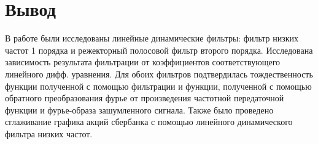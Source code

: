 \documentclass[a4paper, 12pt]{article}
\begin{document}
\section{Вывод}
В работе были исследованы линейные динамические фильтры: фильтр низких частот 1 порядка и режекторный полосовой фильтр второго порядка. Исследована зависимость результата фильтрации от коэффициентов соответствующего линейного дифф. уравнения. 
\newline
Для обоих фильтров подтвердилась тождественность функции полученной с помощью фильтрации и функции, полученной с помощью обратного преобразования фурье от произведения частотной передаточной функции и фурье-образа зашумленного сигнала. 
\newline
Также было проведено сглаживание графика акций сбербанка с помощью линейного динамического фильтра низких частот.
\end{document}
